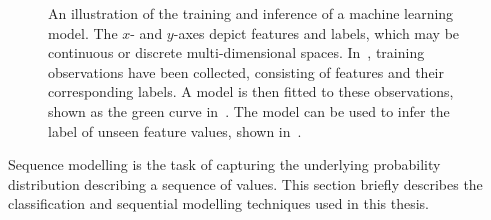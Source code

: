 \begin{figure}
  \centering
  \caption[Training and inference in machine learning]{%
    An illustration of the training and inference of a machine learning model. The $x$- and $y$-axes depict features and labels, which may be continuous or discrete multi-dimensional spaces. In~, training observations have been collected, consisting of features and their corresponding labels. A model is then fitted to these observations, shown as the green curve in~. The model can be used to infer the label of unseen feature values, shown in~.%
  }%
  \label{fig:classification}
\end{figure}

Sequence modelling is the task of capturing the underlying probability distribution describing a sequence of values. This section briefly describes the classification and sequential modelling techniques used in this thesis.

